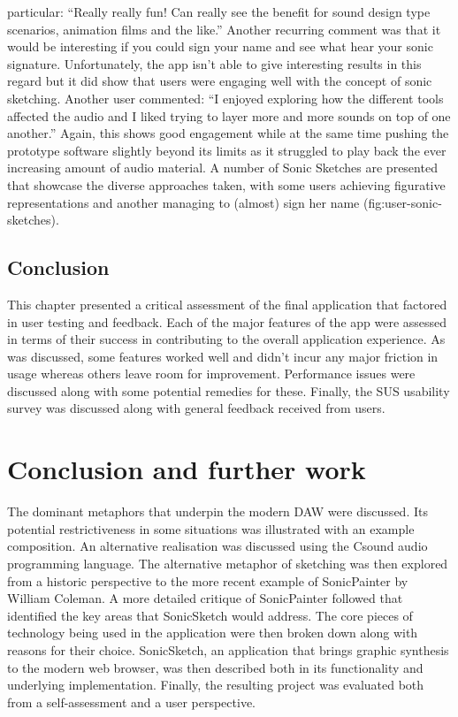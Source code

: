 \documentclass[12pt]{report}
\begin{document}
particular: ``Really really fun! Can really see the benefit for sound design type
scenarios, animation films and the like.'' Another recurring comment was that it
would be interesting if you could sign your name and see what hear your sonic
signature. Unfortunately, the app isn't able to give interesting results in this
regard but it did show that users were engaging well with the concept of sonic
sketching. Another user commented: ``I enjoyed exploring how the different tools
affected the audio and I liked trying to layer more and more sounds on top of
one another.'' Again, this shows good engagement while at the same time pushing
the prototype software slightly beyond its limits as it struggled to play back
the ever increasing amount of audio material. A number of Sonic Sketches are
presented that showcase the diverse approaches taken, with some users achieving
figurative representations and another managing to (almost) sign her name
(fig:user-sonic-sketches).

\chapter{Conclusion}
\label{sec:org027da04}
This chapter presented a critical assessment of the final application that
factored in user testing and feedback. Each of the major features of the app
were assessed in terms of their success in contributing to the overall
application experience. As was discussed, some features worked well and didn't
incur any major friction in usage whereas others leave room for improvement.
Performance issues were discussed along with some potential remedies for these.
Finally, the SUS usability survey was discussed along with general feedback
received from users.

\newpage
\part{Conclusion and further work}
\label{sec:org794038c}
The dominant metaphors that underpin the modern DAW were discussed. Its
potential restrictiveness in some situations was illustrated with an example
composition. An alternative realisation was discussed using the Csound audio
programming language. The alternative metaphor of sketching was then explored
from a historic perspective to the more recent example of SonicPainter by
William Coleman. A more detailed critique of SonicPainter followed that
identified the key areas that SonicSketch would address. The core pieces of
technology being used in the application were then broken down along with
reasons for their choice. SonicSketch, an application that brings graphic
synthesis to the modern web browser, was then described both in its
functionality and underlying implementation. Finally, the resulting project was
evaluated both from a self-assessment and a user perspective.
\end{document}

